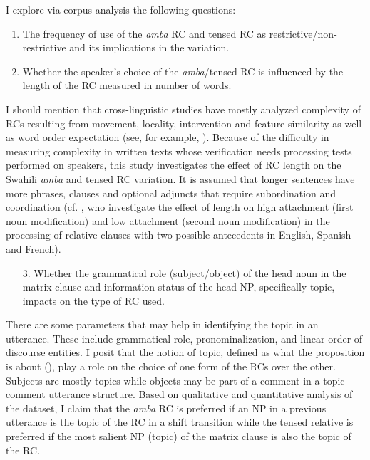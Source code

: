 \documentclass[output=paper,colorlinks,citecolor=brown]{langscibook}
\begin{document}
I explore via corpus analysis the following questions:
 
\begin{enumerate}
        \item The frequency of use of the \textit{amba} RC and tensed RC as restrictive/non-restrictive and its implications in the variation.
        \item Whether the speaker’s choice of the \textit{amba}\slash tensed RC is influenced by the length of the RC measured in number of words.
\end{enumerate}
I should mention that cross-linguistic studies have mostly analyzed complexity of RCs resulting from movement, locality, intervention and feature similarity as well as word order expectation (see, for example, \citealt{DurrlemanEtAl2016, Rizzi2013Locality, LevyEtAl2013}). Because of the difficulty in measuring complexity in written texts whose verification needs processing tests performed on speakers, this study investigates the effect of RC length on the Swahili \textit{amba} and tensed RC variation. It is assumed that longer sentences have more phrases, clauses and optional adjuncts that require subordination and coordination (cf. \citealt{HemforthEtAl2015}, who investigate the effect of length on high attachment (first noun modification) and low attachment (second noun modification) in the processing of relative clauses with two possible antecedents in English, Spanish and French). 

\begin{enumerate}
        \item[3.] Whether the grammatical role (subject/object) of the head noun in the matrix clause and information status of the head NP, specifically topic, impacts on the type of RC used. 
\end{enumerate}
There are some parameters that may help in identifying the topic in an utterance. These include grammatical role, pronominalization, and linear order of discourse entities. I posit that the notion of topic, defined as what the proposition is about (\citealt{Gundel1985, Lambrecht1994}), play a role on the choice of one form of the RCs over the other. Subjects are mostly topics while objects may be part of a comment in a topic-comment utterance structure. Based on qualitative and quantitative analysis of the dataset, I claim that the \textit{amba} RC is preferred if an NP in a previous utterance is the topic of the RC in a shift transition while the tensed relative is preferred if the most salient NP (topic) of the matrix clause is also the topic of the RC.
\end{document}
